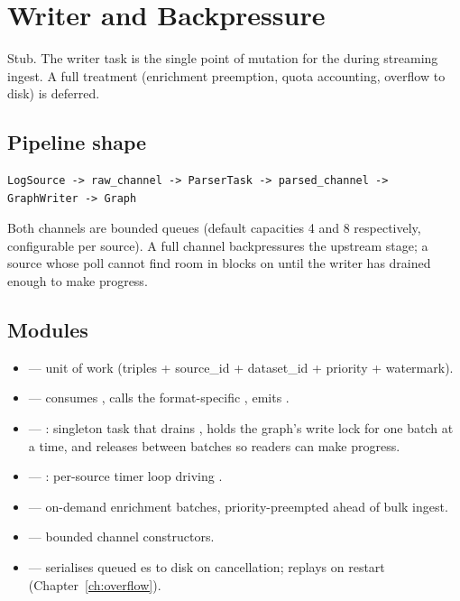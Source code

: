 \chapter{Writer and Backpressure}
\label{ch:writer}

\begin{note}
Stub. The writer task is the single point of mutation for the
\Graph{} during streaming ingest. A full treatment
(enrichment preemption, quota accounting, overflow to disk) is
deferred.
\end{note}

\section{Pipeline shape}

\begin{verbatim}
LogSource -> raw_channel -> ParserTask -> parsed_channel -> GraphWriter -> Graph
\end{verbatim}

Both channels are bounded  queues (default
capacities 4 and 8 respectively, configurable per source). A full
channel backpressures the upstream stage; a source whose poll
cannot find room in  blocks on
 until the writer has drained enough to make
progress.

\section{Modules}

\begin{itemize}
    \item {} ---
         unit of work (triples + source\_id +
        dataset\_id + priority + watermark).
    \item {}
        ---  consumes , calls
        the format-specific , emits
        .
    \item {} ---
        : singleton task that drains
        , holds the graph's write lock for
        one batch at a time, and releases between batches so
        readers can make progress.
    \item {}
        --- : per-source timer loop driving
        .
    \item {}
        --- on-demand enrichment batches, priority-preempted ahead
        of bulk ingest.
    \item {} ---
        bounded channel constructors.
    \item {} ---
        serialises queued es to disk on
        cancellation; replays on restart (Chapter~\ref{ch:overflow}).
\end{itemize}

